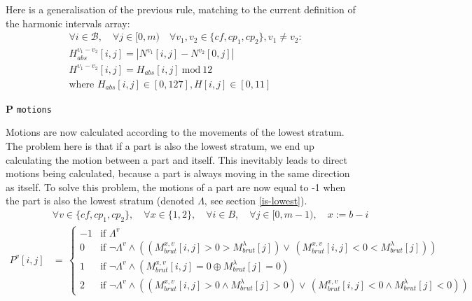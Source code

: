 Here is a generalisation of the previous rule, matching to the current definition of the harmonic intervals array:
\begin{equation}
\begin{aligned}
    &\forall i \in \mathcal{B}, \quad \forall j \in [0, m) \quad \forall v_1, v_2 \in \{cf, cp_1, cp_2\}, v_1 \neq v_2:\\
    &H_{abs}^{v_1-v_2}[i, j] = \left|N^{v_1}[i, j] - N^{v_2}[0,j]\right|\\
    &H^{v_1-v_2}[i, j] = H_{abs}[i, j]\ \text{mod}\ 12\\
    &\text{where } H_{abs}[i, j] \in [0, 127], H[i, j] \in [0, 11]
\end{aligned}
\end{equation}


\vspace{.5cm}
\noindent \textbf{P} \hspace*{.2cm} \texttt{motions}

Motions are now calculated according to the movements of the lowest stratum. The problem here is that if a part is also the lowest stratum, we end up calculating the motion between a part and itself. This inevitably leads to direct motions being calculated, because a part is always moving in the same direction as itself. To solve this problem, the motions of a part are now equal to -1 when the part is also the lowest stratum (denoted $\Lambda$, see section \ref{is-lowest}). 
\begin{equation}
\begin{aligned}
&\forall v \in \{cf, cp_1, cp_2\}, \quad \forall x \in \{1, 2\}, \quad \forall i \in B, \quad \forall j \in [0, m - 1),\quad x := b - i\\
    P^{v}[i,j]& = \,  
    \begin{cases}
        -1 & \text{if } \Lambda^{v} \\
        0 & \text{if } \neg \Lambda^{v} \land ((M_{brut}^{x, v}[i, j] > 0 > M^{\lambda}_{brut}[j]) \vee\, (M_{brut}^{x, v}[i, j] < 0 < M^{\lambda}_{brut}[j])) \\
        1 & \text{if } \neg \Lambda^{v} \land (M_{brut}^{x, v}[i, j] = 0  \oplus M^{\lambda}_{brut}[j]=0) \\
        2 & \text{if } \neg \Lambda^{v} \land ((M_{brut}^{x, v}[i, j] > 0 \land M^{\lambda}_{brut}[j] > 0) \vee\, (M_{brut}^{x, v}[i, j] < 0 \land M^{\lambda}_{brut}[j] <0))
    \end{cases}
\end{aligned}
\end{equation}
